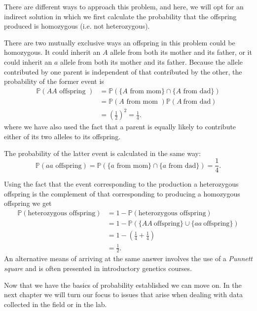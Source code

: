 \documentclass[../book.tex]{subfiles}
\begin{document}
\begin{solution}
There are different ways to approach this problem, and here, we will opt for an indirect solution in which we first calculate the probability that the offspring produced is homozygous (i.e. not heterozygous).

There are two mutually exclusive ways an offspring in this problem could be homozygous. It could inherit an \(A\) allele from both its mother and its father, or it could inherit an \(a\) allele from both its mother and its father. Because the allele contributed by one parent is independent of that contributed by the other, the probability of the former event is
\begin{equation}\label{eq:prob-22}
\begin{aligned}
\mathbb{P} ( AA \text{ offspring } ) 
&= \mathbb{P}( \{ A \text{ from mom}\} \cap \{ A \text{ from dad}\} ) \\
&= \mathbb{P}( A\text{ from mom } )  \mathbb{P}( A\ \text{from dad} ) \\
&= \left( \frac{1}{2} \right)^2 = \frac{1}{4}.
\end{aligned}
\end{equation}
where we have also used the fact that a parent is equally likely to contribute either of its two alleles to its offspring.

The probability of the latter event is calculated in the same way:
\begin{equation}\label{eq:prob-23}
\mathbb{P} ( aa \text{ offspring} ) = \mathbb{P}( \{ a \text{ from mom}\} \cap \{ a \text{ from dad}\} ) = \frac{1}{4}.
\end{equation}

Using the fact that the event corresponding to the production a heterozygous offspring is the complement of that corresponding to producing a homozygous offspring we get
\begin{equation}\label{eq:prob-24}
\begin{aligned}
  \mathbb{P} ( \text{heterozygous offspring} )
  &= 1 - \mathbb{P} ( \text{heterozygous offspring} ) \\
  &= 1 - \mathbb{P} ( \{ AA\ \text{offspring} \} \cup \{ aa\ \text{offspring} \} ) \\
  &= 1 - \left( \frac{1}{4} + \frac{1}{4} \right) \\
  &= \frac{1}{2}.
\end{aligned}
\end{equation}
An alternative means of arriving at the same answer involves the use of a \emph{Punnett square} and is often presented in introductory genetics courses.
\end{solution}

Now that we have the basics of probability established we can move on. In the next chapter we will turn our focus to issues that arise when dealing with data collected in the field or in the lab.
\end{document}
